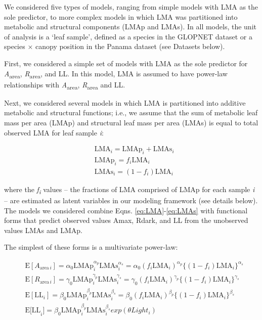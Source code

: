 \documentclass[
  12pt,
  a4paper,
,tablecaptionabove
]{scrartcl}
\begin{document}
We considered five types of models, ranging from simple models with LMA as the sole predictor, to more complex models in which LMA was partitioned into metabolic and structural components (LMAp and LMAs).
In all models, the unit of analysis is a `leaf sample', defined as a species in the GLOPNET dataset or a species \(\times\) canopy position in the Panama dataset (see Datasets below).

First, we considered a simple set of models with LMA as the sole predictor for \emph{A}\textsubscript{area}, \emph{R}\textsubscript{area}, and LL.
In this model, LMA is assumed to have power-law relationships with \emph{A}\textsubscript{area}, \emph{R}\textsubscript{area} and LL.

Next, we considered several models in which LMA is partitioned into additive metabolic and structural functions; i.e., we assume that the sum of metabolic leaf mass per area (LMAp) and structural leaf mass per area (LMAs) is equal to total observed LMA for leaf sample \emph{i}:

\begin{align}
  &\mathrm{LMA}_{i} =\mathrm{LMAp}_{i} + \mathrm{LMAs}_{i} \label{eq:LMA}\\
  &\mathrm{LMAp}_{i} = f_{i} \mathrm{LMA}_{i} \label{eq:LMAp}\\
  &\mathrm{LMAs}_{i} = (1 - f_{i})  \mathrm{LMA}_{i}\label{eq:LMAs}
\end{align}

where the \emph{f\textsubscript{i}} values -- the fractions of LMA comprised of LMAp for each sample \emph{i} -- are estimated as latent variables in our modeling framework (see details below).
The models we considered combine Eqns. \eqref{eq:LMA}-\eqref{eq:LMAs} with functional forms that predict observed values Amax, Rdark, and LL from the unobserved values LMAs and LMAp.

The simplest of these forms is a multivariate power-law:

\begin{align}
& \mathrm{E}[A_{\mathrm{area} \, i}]
= \alpha_0\mathrm{LMAp}_{i}^{\alpha_p}\mathrm{LMAs}_i^{\alpha_s}  =  \alpha_0 (f_i \mathrm{LMA}_{i})^{\alpha_p} \bigl\{(1-f_i) \mathrm{LMA}_{i}\bigr\}^{\alpha_s} \label{eq:E-A} \\
& \mathrm{E}[R_{\mathrm{area} \, i}]
= \gamma_0\mathrm{LMAp}_{i}^{\gamma_p} \mathrm{LMAs}_{i}^{\gamma_s}
= \gamma_0 (f_i \mathrm{LMA}_{i})^{\gamma_p} \bigl\{(1-f_i)\mathrm{LMA}_{i}\bigr\}^{\gamma_s} \label{eq:E-R} \\
& \mathrm{E}[\mathrm{LL}_i] = \beta_0\mathrm{LMAp}_{i}^{\beta_p} \mathrm{LMAs}_{i}^{\beta_s}   = \beta_0 (f_i \mathrm{LMA}_{i})^{\beta_p} \bigl\{(1-f_i) \mathrm{LMA}_{i}\bigr\}^{\beta_s} \tag{6a}  \\
& \mathrm{E[LL}_i] = \beta_0\mathrm{LMAp}_{i}^{\beta_p} \mathrm{LMAs}_{i}^{\beta_s} exp(\theta Light_i) \tag{6b}
\end{align}
\end{document}
